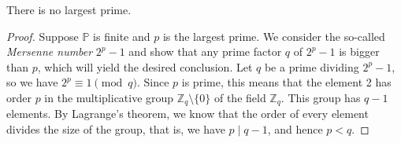 \begin{theorem}
    \label{thm:third_proof}
    \leanok
    There is no largest prime.
\end{theorem}
\begin{proof}
    \leanok
    Suppose \(\mathbb{P}\) is finite and \(p\) is the largest prime.
    We consider the so-called \emph{Mersenne number} \(2^p - 1\)
    and show that any prime factor \(q\) of \(2^p - 1\) is bigger than \(p\),
    which will yield the desired conclusion.
    Let \(q\) be a prime dividing \(2^p - 1\), so we have \(2^p \equiv 1 \pmod{q}\). Since \(p\) is prime,
    this means that the element 2 has order \(p\) in the multiplicative group \(\mathbb{Z}_q \setminus \{0\}\)
    of the field \(\mathbb{Z}_q\). This group has \(q - 1\) elements.
    By Lagrange's theorem, we know that the order of every element divides the size of the group, that is,
    we have \(p \mid q - 1\), and hence \(p < q\).
\end{proof}

